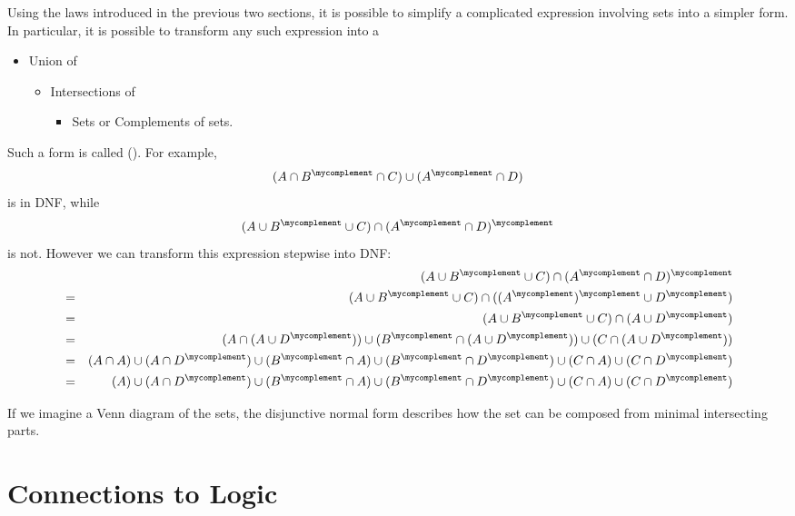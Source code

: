 Using the laws introduced in the previous two sections, it is possible to
simplify a complicated expression involving sets into a simpler form. In
particular, it is possible to transform any such expression into a 
\begin{itemize}
\itemsep-2mm
\item[] Union of
\begin{itemize}
\itemsep-2mm
\item[] Intersections of
\begin{itemize}
\itemsep-2mm
\item[] Sets or Complements of sets.
\end{itemize}
\end{itemize}
\end{itemize}
Such a form is called  (). For example, 
\[
(A\cap B^\mycomplement\cap C)\cup (A^\mycomplement\cap D)
\]
is in DNF, while
\[
(A\cup B^\mycomplement\cup C)\cap (A^\mycomplement\cap D)^\mycomplement
\]
is not. However we can transform this expression stepwise into DNF:
\begin{eqnarray*}
&&(A\cup B^\mycomplement\cup C)\cap (A^\mycomplement\cap D)^\mycomplement\\
&=&(A\cup B^\mycomplement\cup C)\cap ((A^\mycomplement)^\mycomplement\cup
D^\mycomplement)\\
&=&(A\cup B^\mycomplement\cup C)\cap (A\cup D^\mycomplement)\\
&=&(A\cap (A\cup D^\mycomplement))\cup (B^\mycomplement\cap (A\cup
D^\mycomplement))\cup (C\cap (A\cup D^\mycomplement))\\
&=&(A\cap A)\cup (A\cap D^\mycomplement)\cup (B^\mycomplement\cap A)\cup
(B^\mycomplement\cap D^\mycomplement)\cup (C\cap A)\cup (C\cap D^\mycomplement)\\
&=&(A)\cup (A\cap D^\mycomplement)\cup (B^\mycomplement\cap A)\cup
(B^\mycomplement\cap D^\mycomplement)\cup (C\cap A)\cup (C\cap D^\mycomplement)\\
\end{eqnarray*}

If we imagine a Venn diagram of the sets, the disjunctive normal form
describes how the set can be composed from minimal intersecting parts.

\section{Connections to Logic}

